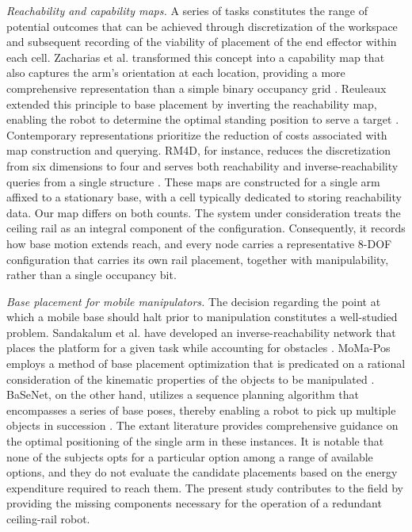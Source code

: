 \documentclass[conference]{IEEEtran}
\begin{document}
\noindent\textit{Reachability and capability maps.}
A series of tasks constitutes the range of potential outcomes that can be 
achieved through discretization of the workspace and subsequent recording of 
the viability of placement of the end effector within each cell. Zacharias et al. 
transformed this concept into a capability map that also captures the arm's orientation 
at each location, providing a more comprehensive representation than a simple binary 
occupancy grid \cite{Zacharias2007}. Reuleaux extended this principle to base placement 
by inverting the reachability map, enabling the robot to determine the optimal 
standing position to serve a target \cite{Makhal2018}. Contemporary representations 
prioritize the reduction of costs associated with map construction and querying. 
RM4D, for instance, reduces the discretization from six dimensions to four and 
serves both reachability and inverse-reachability queries from a single structure \cite{RM4D2024}. 
These maps are constructed for a single arm affixed to a stationary base, 
with a cell typically dedicated to storing reachability data. Our map differs 
on both counts. The system under consideration treats the ceiling rail as an integral 
component of the configuration. Consequently, it records how base motion extends reach, 
and every node carries a representative 8-DOF configuration that carries its own rail 
placement, together with manipulability, rather than a single occupancy bit.

\noindent\textit{Base placement for mobile manipulators.}
The decision regarding the point at which a mobile base should halt prior to 
manipulation constitutes a well-studied problem. Sandakalum et al. have developed an 
inverse-reachability network that places the platform for a given task while accounting 
for obstacles \cite{InvReach2022}.
MoMa-Pos employs a method of base placement optimization that is predicated on a 
rational consideration of the kinematic properties of the objects to be manipulated \cite{MoMaPos2024}. 
BaSeNet, on the other hand, utilizes a sequence planning algorithm that encompasses 
a series of base poses, thereby enabling a robot to pick up multiple objects in 
succession \cite{BaSeNet2024}. The extant literature provides comprehensive guidance 
on the optimal positioning of the single arm in these instances. It is notable that 
none of the subjects opts for a particular option among a range of available options, 
and they do not evaluate the candidate placements based on the energy expenditure 
required to reach them. The present study contributes to the field by providing 
the missing components necessary for the operation of a redundant ceiling-rail robot. 
\end{document}
